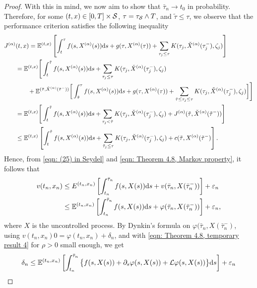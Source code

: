\begin{proof}
    With this in mind, we now aim to show that $\bar \tau_n \rightarrow t_0$ in probability. Therefore, for some $(t,x) \in [0,T] \times \mathcal{S}$, $\tau = \tau_{\mathcal{S}} \wedge T$, and $\tilde \tau \leq \tau$, we observe that the performance criterion satisfies the following inequality
    \begin{align}
        J^{(\alpha)}&(t,x) = \mathbb{E}^{(t,x)} \left[ \int_t^{\tau} f(s,X^{(\alpha)}(s)) \mathrm{d} s + g(\tau,X^{(\alpha)}(\tau)) + \sum_{\tau_j \leq \tau} K(\tau_j, \check{X}^{(\alpha)}(\tau_j^-), \zeta_j) \right] \nonumber \\
        &= \mathbb{E}^{(t,x)} \Bigg[ \int_t^{\tilde \tau} f(s,X^{(\alpha)}(s)) \mathrm{d} s + \sum_{\tau_j \leq \tau} K(\tau_j, \check{X}^{(\alpha)}(\tau_j^-), \zeta_j) \nonumber  \\
        & \qquad + \mathbb{E}^{(\tilde \tau, \check{X}^{(\alpha)}(\tilde \tau^-))}\bigg[ \int_{\tilde \tau}^{\tau} f(s,X^{(\alpha)}(s)) \mathrm{d} s + g(\tau, X^{(\alpha)}(\tau)) + \sum_{\tilde \tau \leq \tau_j \leq \tau} K(\tau_j, \check{X}^{(\alpha)}(\tau_j^-),\zeta_j) \bigg] \Bigg] \nonumber \\
        &= \mathbb{E}^{(t,x)} \Bigg[ \int_t^{\tilde \tau} f(s,X^{(\alpha)}(s)) \mathrm{d} s + \sum_{\tau_j < \tilde \tau} K(\tau_j, \check{X}^{(\alpha)}(\tau_j^-), \zeta_j) + J^{(\alpha)}(\tilde \tau, \check{X}^{(\alpha)}(\tilde \tau ^-)) \Bigg] \nonumber  \\
        & \leq \mathbb{E}^{(t,x)} \left[ \int_t^{\tilde \tau} f(s,X^{(\alpha)}(s)) \mathrm{d} s + \sum_{\tilde \tau_j \leq \tau} K(\tau_j, \check{X}^{(\alpha)}(\tau_j^-),\zeta_j) + c(\tilde \tau, X^{(\alpha)}(\tilde \tau^-) \right]
        \label{eqn: Theorem 4.8, Markov property}. 
    \end{align}
    Hence, from \eqref{eqn: (25) in Seydel} and \eqref{eqn: Theorem 4.8, Markov property}, it follows that
    \begin{align*}
        v(t_n,x_n) &\leq E^{(t_n,x_n)} \left[ \int_{t_n}^{\bar \tau_n} f(s,X(s)) \mathrm{d} s + v(\bar \tau_n, X(\bar \tau_n^-)) \right] + \varepsilon_n \\
        & \leq \mathbb{E}^{(t_n,x_n)} \left[ \int_{t_n}^{\bar \tau_n} f(s,X(s)) \mathrm{d} s + \varphi(\bar \tau_n, X(\bar \tau_n^-)) \right] + \varepsilon_n,
    \end{align*}
    where $X$ is the uncontrolled process. By Dynkin's formula on $\varphi(\bar \tau_n, X(\bar \tau_n^-)$, using $v(t_n,x_n) 0 = \varphi(t_n,x_n) + \delta_n$, and with \eqref{eqn: Theorem 4.8, temporary result 4} for $\rho>0$ small enough, we get
    \begin{align*}
        \delta_n &\leq \E^{(t_n,x_n)} \left[ \int_{t_n}^{\bar \tau_n} \big\{ f(s,X(s)) + \partial_s \varphi(s, X(s)) + \InfinitesimalGenerator \varphi(s, X(s)) \big\}  \diff s \right] + \varepsilon_n \\

\end{align*}
\end{proof}
